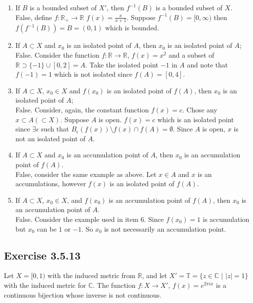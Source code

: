\documentclass{tufte-book}
\theoremstyle{mytheoremstyle}
\theoremstyle{mylemstyle}
\theoremstyle{mydefstyle}
\begin{document}
\begin{enumerate}
\item If $B$ is a bounded subset of $X'$, then $f^{-1}(B)$ is a bounded subset of $X$.\\
False, define $f: \mathbb{R}_+ \to \mathbb{R}$ $f(x) = \frac{x}{x+1}$. Suppose $f^{-1}(B) = [0, \infty)$ then $f(f^{-1}(B)) = B = (0,1)$ which is bounded.

\item If $A \subset X$ and $x_0$ is an isolated point of $A$, then $x_0$ is an isolated point of $A$;\\
False.  Consider the function $f: \mathbb{R} \to \mathbb{R}$, $f(x) = x^2$ and a subset of $\mathbb{R} \supset \{-1\} \cup [0,2]= A$.  Take the isolated point $-1$ in $A$ and note that $f(-1) = 1$ which is not isolated since $f(A) = [0,4]$.

\item If $A \subset X$, $x_0 \in X$ and $f(x_0)$ is an isolated point of $f(A)$, then $x_0$ is an isolated point of $A$;\\
False.  Consider, again, the constant function $f(x) = c$.  Chose any $x \subset A (\subset X)$.  Suppose $A$ is open.  $f(x) = c$ which is an isolated point since $\exists\epsilon$ such that $B_\epsilon(f(x)) \setminus f(x) \cap f(A) = \emptyset$.  Since $A$ is open, $x$ is not an isolated point of $A$.

\item If $A \subset X$ and $x_0$ is an accumulation point of $A$, then $x_0$ is an accumulation point of $f(A)$.\\
False, consider the same example as above.  Let $x \in A$ and $x$ is an accumulations, however $f(x)$ is an isolated point of $f(A)$.

\item If $A \subset X$, $x_0 \in X$, and $f(x_0)$ is an accumulation point of $f(A)$, then $x_0$ is an accumulation point of $A$.\\
False.  Consider the example used in item $6$.  Since $f(x_0) = 1$ is accumulation but $x_0$ can be $1$ or $-1$.  So $x_0$ is not necessarily an accumulation point.

\end{enumerate}

\subsection{Exercise 3.5.13}
Let $X = [0,1)$ with the induced metric from $\mathbb{R}$, and let $X' = \mathbb{T} = \{z \in \mathbb{C}\text{ | } |z| = 1 \}$ with the induced metric for $\mathbb{C}$. The function $f : X \to X'$, $f(x) = e^{2\pi i x}$ is a continuous bijection whose inverse is not continuous.
\end{document}
